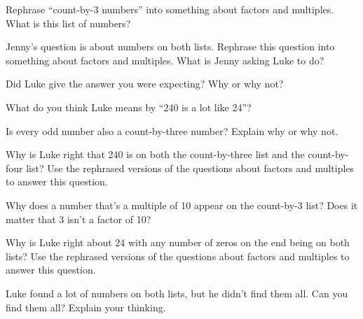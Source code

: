 \documentclass{ximera}
\begin{document}
\begin{problem} Rephrase ``count-by-3 numbers'' into something about factors and multiples. What is this list of numbers?
\end{problem}


\begin{problem} Jenny’s question is about numbers on both lists. Rephrase this question into something about factors and multiples. What is Jenny asking Luke to do?
\end{problem}

\begin{problem} Did Luke give the answer you were expecting? Why or why not?
\end{problem}

\begin{problem} What do you think Luke means by ``240 is a lot like 24''?
\end{problem}

\begin{problem}
Is every odd number also a count-by-three number? Explain why or why not.
\end{problem}


\begin{problem} Why is Luke right that 240 is on both the count-by-three list and the count-by-four list? Use the rephrased versions of the questions about factors and multiples to answer this question.
\end{problem}

\begin{problem} Why does a number that’s a multiple of 10 appear on the count-by-3 list? Does it matter that 3 isn't a factor of 10?
\end{problem}

\begin{problem} Why is Luke right about 24 with any number of zeros on the end being on both lists? Use the rephrased versions of the questions about factors and multiples to answer this question.
\end{problem}

\begin{problem}
Luke found a lot of numbers on both lists, but he didn't find them all. Can you find them all? Explain your thinking.
\end{problem}

\end{document}
